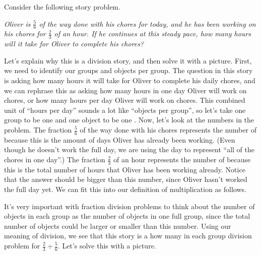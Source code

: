 \documentclass{ximera}
\begin{document}
\begin{example}
Consider the following story problem.

\emph{Oliver is $\frac{5}{6}$ of the way done with his chores for today, and he has been working on his chores for $\frac{2}{3}$ of an hour. If he continues at this steady pace, how many hours will it take for Oliver to complete his chores?} 

Let's explain why this is a division story, and then solve it with a picture. First, we need to identify our groups and objects per group. The question in this story is asking how many hours it will take for Oliver to complete his daily chores, and we can rephrase this as asking how many hours in one day Oliver will work on chores, or how many hours per day Oliver will work on chores. This combined unit of ``hours per day'' sounds a lot like ``objects per group'', so let's take one group to be one  and one object to be one  . Now, let's look at the numbers in the problem. The fraction $\frac{5}{6}$ of the way done with his chores represents the number of  because this is the amount of days Oliver has already been working. (Even though he doesn't work the full day, we are using the day to represent ``all of the chores in one day''.) The fraction $\frac{2}{3}$ of an hour represents the number of  because this is the total number of hours that Oliver has been working already. Notice that the answer should be bigger than this number, since Oliver hasn't worked the full day yet. We can fit this into our definition of multiplication as follows.

\begin{image}
\end{image}
It's very important with fraction division problems to think about the number of objects in each group as the number of objects in one full group, since the total number of objects could be larger or smaller than this number. Using our meaning of division, we see that this story is a how many in each group division problem for $\frac{2}{3} \div \frac{5}{6}$. Let's solve this with a picture.


\end{example}
\end{document}
